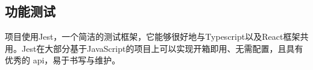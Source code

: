 \subsection{功能测试}
\par 项目使用Jest，一个简洁的测试框架，它能够很好地与Typescript以及React框架共用。Jest在大部分基于JavaScript的项目上可以实现开箱即用、无需配置，且具有优秀的 api，易于书写与维护。





